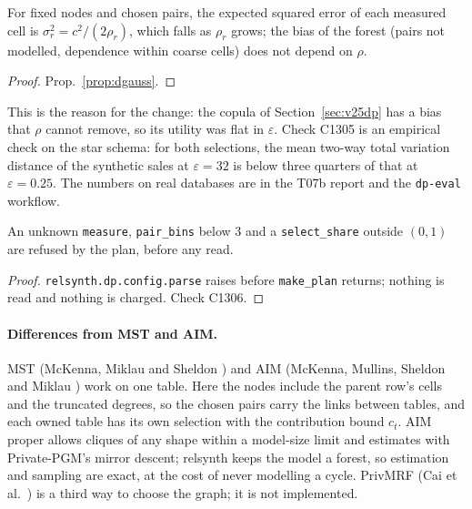 \setcounter{proposition}{1304}
\begin{proposition}\label{prop:dpmonotone}
For fixed nodes and chosen pairs, the expected squared error of each measured cell is $\sigma_r^2=c^2/(2\rho_r)$, which falls as $\rho_r$ grows; the bias of the forest (pairs not modelled, dependence within coarse cells) does not depend on $\rho$.
\end{proposition}
\begin{proof}
Prop.~\ref{prop:dgauss}.
\end{proof}
\noindent This is the reason for the change: the copula of Section~\ref{sec:v25dp} has a bias that $\rho$ cannot remove, so its utility was flat in $\varepsilon$. Check C1305 is an empirical check on the star schema: for both selections, the mean two-way total variation distance of the synthetic sales at $\varepsilon=32$ is below three quarters of that at $\varepsilon=0.25$. The numbers on real databases are in the T07b report and the \texttt{dp-eval} workflow.

\setcounter{proposition}{1305}
\begin{proposition}[Scope]\label{prop:selscope}
An unknown \texttt{measure}, \texttt{pair\_bins} below 3 and a \texttt{select\_share} outside $(0,1)$ are refused by the plan, before any read.
\end{proposition}
\begin{proof}
\texttt{relsynth.dp.config.parse} raises before \texttt{make\_plan} returns; nothing is read and nothing is charged. Check C1306.
\end{proof}

\paragraph{Differences from MST and AIM.} MST (McKenna, Miklau and Sheldon \cite{mckenna2021mst}) and AIM (McKenna, Mullins, Sheldon and Miklau \cite{mckenna2022aim}) work on one table. Here the nodes include the parent row's cells and the truncated degrees, so the chosen pairs carry the links between tables, and each owned table has its own selection with the contribution bound $c_t$. AIM proper allows cliques of any shape within a model-size limit and estimates with Private-PGM's mirror descent; relsynth keeps the model a forest, so estimation and sampling are exact, at the cost of never modelling a cycle. PrivMRF (Cai et al.\ \cite{cai2021privmrf}) is a third way to choose the graph; it is not implemented.

\setcounter{proposition}{\value{savedpropdpsel}}
